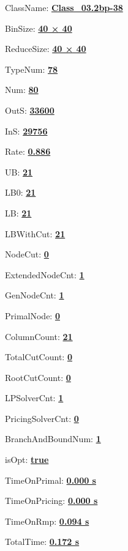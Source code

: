 \documentclass[11pt]{article}
\begin{document}
\pagestyle{empty}


ClassName: \underline{\textbf{Class_03.2bp-38}}
\par
BinSize: \underline{\textbf{40 × 40}}
\par
ReduceSize: \underline{\textbf{40 × 40}}
\par
TypeNum: \underline{\textbf{78}}
\par
Num: \underline{\textbf{80}}
\par
OutS: \underline{\textbf{33600}}
\par
InS: \underline{\textbf{29756}}
\par
Rate: \underline{\textbf{0.886}}
\par
UB: \underline{\textbf{21}}
\par
LB0: \underline{\textbf{21}}
\par
LB: \underline{\textbf{21}}
\par
LBWithCut: \underline{\textbf{21}}
\par
NodeCut: \underline{\textbf{0}}
\par
ExtendedNodeCnt: \underline{\textbf{1}}
\par
GenNodeCnt: \underline{\textbf{1}}
\par
PrimalNode: \underline{\textbf{0}}
\par
ColumnCount: \underline{\textbf{21}}
\par
TotalCutCount: \underline{\textbf{0}}
\par
RootCutCount: \underline{\textbf{0}}
\par
LPSolverCnt: \underline{\textbf{1}}
\par
PricingSolverCnt: \underline{\textbf{0}}
\par
BranchAndBoundNum: \underline{\textbf{1}}
\par
isOpt: \underline{\textbf{true}}
\par
TimeOnPrimal: \underline{\textbf{0.000 s}}
\par
TimeOnPricing: \underline{\textbf{0.000 s}}
\par
TimeOnRmp: \underline{\textbf{0.094 s}}
\par
TotalTime: \underline{\textbf{0.172 s}}
\par
\newpage


\end{document}
